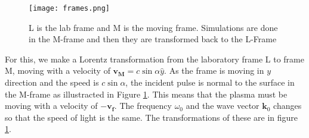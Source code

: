 \begin{figure}[H]
    \centering
    \texttt{[image: frames.png]}
    \centering
    \caption{L is the lab frame and M is the moving frame. Simulations are done in the M-frame and then they are transformed back to the L-Frame}
    \label{fig:frames}
\end{figure}


For this, we make a Lorentz transformation from the laboratory frame L to frame M, moving with a velocity of $\mathbf{v_M} = c\sin\alpha \hat{y}$. As the frame is moving in $y$ direction and the speed is $c\sin\alpha$, the incident pulse is normal to the surface in the M-frame as illustracted in Figure \ref{fig:frames}. This means that the plasma must be moving with a velocity of $-\mathbf{v_f}$. The frequency $\omega_0$ and the wave vector $\mathbf{k}_0$ changes so that the speed of light is the same. The transformations of these are in figure \ref{fig:frames}.


